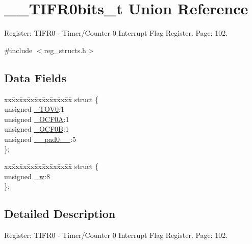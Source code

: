 \hypertarget{union_____t_i_f_r0bits__t}{\section{\+\_\+\+\_\+\+T\+I\+F\+R0bits\+\_\+t Union Reference}
\label{union_____t_i_f_r0bits__t}
}


Register\+: T\+I\+F\+R0 -\/ Timer/\+Counter 0 Interrupt Flag Register. Page\+: 102.  




{\ttfamily \#include $<$reg\+\_\+structs.\+h$>$}

\subsection*{Data Fields}
\begin{DoxyCompactItemize}
\item 
\begin{tabbing}
xx\=xx\=xx\=xx\=xx\=xx\=xx\=xx\=xx\=\kill
struct \{\\
\>unsigned \hyperlink{union_____t_i_f_r0bits__t_a5c19aa536e98df99fe78e24d29d61de5}{\_TOV0}:1\\
\>unsigned \hyperlink{union_____t_i_f_r0bits__t_a27d783015db7c23037584dad289cd738}{\_OCF0A}:1\\
\>unsigned \hyperlink{union_____t_i_f_r0bits__t_a826ce9e93c938151b8fae799e2d5cd77}{\_OCF0B}:1\\
\>unsigned \hyperlink{union_____t_i_f_r0bits__t_aa10d093f97fa172bb08c6bd49467dd2e}{\_\_pad0\_\_}:5\\
\}; \\

\end{tabbing}\item 
\begin{tabbing}
xx\=xx\=xx\=xx\=xx\=xx\=xx\=xx\=xx\=\kill
struct \{\\
\>unsigned \hyperlink{union_____t_i_f_r0bits__t_a9e1977f1af28914108e0c29e658daf4c}{\_w}:8\\
\}; \\

\end{tabbing}\end{DoxyCompactItemize}


\subsection{Detailed Description}
Register\+: T\+I\+F\+R0 -\/ Timer/\+Counter 0 Interrupt Flag Register. Page\+: 102. 

